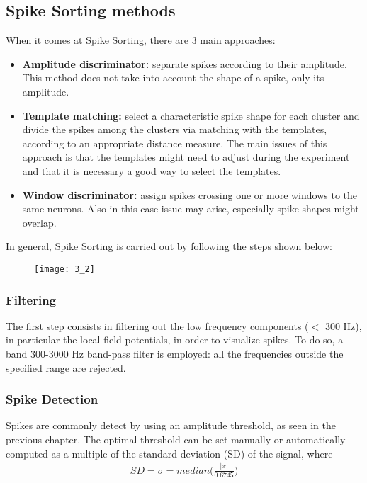 \subsection{Spike Sorting methods}
When it comes at Spike Sorting, there are 3 main approaches:
\begin{itemize}
    \item \textbf{Amplitude discriminator:} separate spikes according to their amplitude.
    This method does not take into account the shape of a spike, only its
    amplitude.
    \item \textbf{Template matching:} select a characteristic spike shape for each cluster
    and divide the spikes among the clusters via matching with the templates,
    according to an appropriate distance measure. The main issues of this
    approach is that the templates might need to adjust during the experiment
    and that it is necessary a good way to select the templates.
    \item \textbf{Window discriminator:} assign spikes crossing one or more windows
    to the same neurons. Also in this case issue may arise, especially spike
    shapes might overlap.
\end{itemize}
In general, Spike Sorting is carried out by following the steps shown below:
\begin{figure}[H]
    \texttt{[image: 3\_2]}
    \centering
\end{figure}
\subsubsection{Filtering}
The first step consists in filtering out the low frequency components
(\(<\) 300 Hz), in particular the local field potentials, in order to visualize
spikes.
To do so, a band 300-3000 Hz band-pass filter is employed: all the
frequencies outside the specified range are rejected.
\subsubsection{Spike Detection}
Spikes are commonly detect by using an amplitude threshold, as seen in the
previous chapter. The optimal threshold can be set manually or automatically
computed as a multiple of the standard deviation (SD) of the signal, where
\begin{align*}
    SD=\sigma=median\biggl(\frac{|x|}{0.6745}\biggr)
\end{align*}
